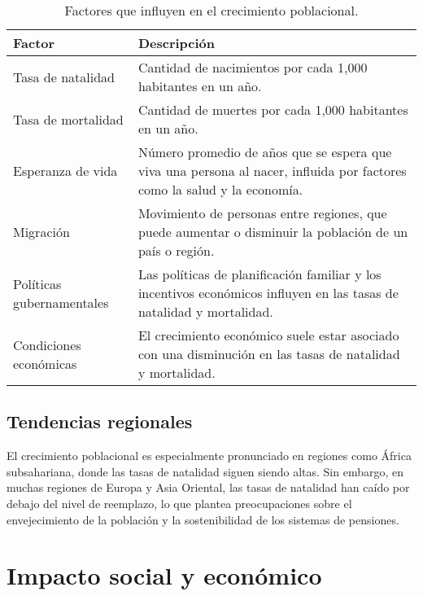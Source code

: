 \begin{table}[h]
\centering
\begin{tabular}{@{}ll@{}}
\toprule
\textbf{Factor}                & \textbf{Descripción}                                                                                                      \\ \midrule
Tasa de natalidad              & Cantidad de nacimientos por cada 1,000 habitantes en un año.                                                                \\
Tasa de mortalidad             & Cantidad de muertes por cada 1,000 habitantes en un año.                                                                    \\
Esperanza de vida              & Número promedio de años que se espera que viva una persona al nacer, influida por factores como la salud y la economía.    \\
Migración                      & Movimiento de personas entre regiones, que puede aumentar o disminuir la población de un país o región.                     \\
Políticas gubernamentales      & Las políticas de planificación familiar y los incentivos económicos influyen en las tasas de natalidad y mortalidad.        \\
Condiciones económicas         & El crecimiento económico suele estar asociado con una disminución en las tasas de natalidad y mortalidad.                   \\ \bottomrule
\end{tabular}
\caption{Factores que influyen en el crecimiento poblacional.}
\label{tabla2}
\end{table}

\subsection{Tendencias regionales}

El crecimiento poblacional es especialmente pronunciado en regiones como África subsahariana, donde las tasas de natalidad siguen siendo altas. Sin embargo, en muchas regiones de Europa y Asia Oriental, las tasas de natalidad han caído por debajo del nivel de reemplazo, lo que plantea preocupaciones sobre el envejecimiento de la población y la sostenibilidad de los sistemas de pensiones.

\section{Impacto social y económico}

